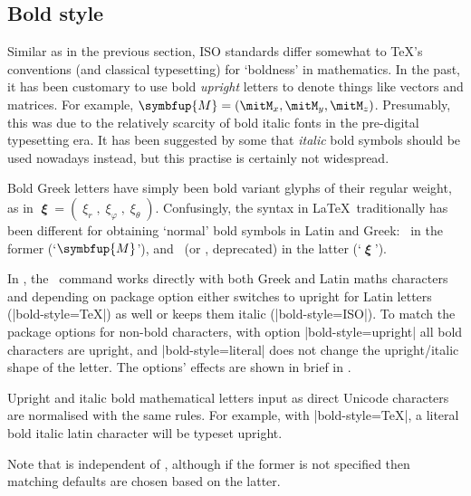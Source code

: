 \subsection{Bold style}

Similar as in the previous section, ISO standards differ somewhat to \TeX's
conventions (and classical typesetting) for `boldness' in mathematics. In
the past, it has been customary to use bold \emph{upright} letters to denote
things like vectors and matrices. For example, \( \symbfup{M} =
(\mitM_x,\mitM_y,\mitM_z) \). Presumably, this was due to the relatively
scarcity of bold italic fonts in the pre-digital typesetting era.
It has been suggested by some that \emph{italic} bold symbols should be used nowadays instead, but this practise is certainly not widespread.

Bold Greek letters have simply been bold variant glyphs of their regular
weight, as in \( \mbfitxi = (\mitxi_\mitr,\mitxi_\mitphi,\mitxi_\mittheta)
\).
Confusingly, the syntax in \LaTeX\ traditionally has been different for obtaining `normal' bold symbols in Latin and Greek: \cmd\mathbf\ in the former (`$\symbfup{M}$'), and \cmd\bm\ (or
\cmd\boldsymbol, deprecated) in the latter (`$\mbfitxi$').

In , the \cmd\symbf\ command works directly with both
Greek and Latin maths characters and depending on package option
either switches to upright for Latin letters (|bold-style=TeX|) as well or
keeps them italic (|bold-style=ISO|).
To match the package options for non-bold characters, with option
|bold-style=upright| all bold characters are upright, and
|bold-style=literal| does not change the upright/italic shape of the letter.
The  options' effects are shown in brief in .

Upright and italic bold mathematical letters input as direct Unicode
characters are normalised with the same rules. For example, with
|bold-style=TeX|, a literal bold italic latin character will be typeset
upright.

Note that  is independent of , although if
the former is not specified then matching defaults are chosen based on the
latter.


